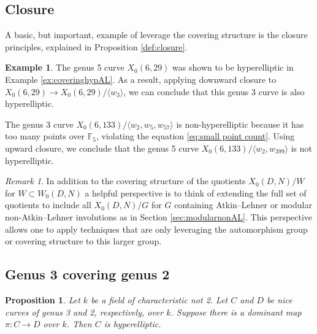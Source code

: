 \documentclass[12pt]{amsart}
\newcommand{\F}{\mathbb{F}}
\numberwithin{equation}{subsection}
\theoremstyle{plain}\newtheorem{ithm}{Theorem}
\theoremstyle{plain}\newtheorem{iprop}[ithm]{Proposition}
\newtheorem{proposition}[equation]{Proposition}
\theoremstyle{definition}
\newtheorem{example}[equation]{Example}
\theoremstyle{remark}
\newtheorem{remark}[equation]{Remark}
\newcommand{\Curve}[2]{X_0({#1},{#2})} %
\newcommand{\ALfull}[2]{W_0({#1},{#2})} %
\begin{document}
\subsection{Closure}
A basic, but important, example of leverage the covering structure is the closure principles, explained in Proposition \ref{def:closure}.


\begin{example}
The genus 5 curve $\Curve{6}{29}$ was shown to be hyperelliptic in Example \ref{ex:coveringhypAL}. As a result, applying downward closure to $\Curve{6}{29} \to \Curve{6}{29}/\langle w_3 \rangle $, we can conclude that this genus 3 curve is also hyperelliptic. 

The genus 3 curve $\Curve{6}{133}/\langle w_2, w_{5}, w_{57} \rangle$ is non-hyperelliptic because it has too many points over $\F_5$, violating the equation \eqref{eq:small point count}. 
Using upward closure, we conclude that the genus 5 curve $\Curve{6}{133}/\langle w_2 , w_{399} \rangle$ is not hyperelliptic.
\end{example}

\begin{remark}
In addition to the covering structure of the quotients $\Curve{D}{N}/W$ for $W \subset \ALfull{D}{N}$ a helpful perspective is to think of extending the full set of quotients to include all $\Curve{D}{N}/G$ for $G$ containing  Atkin--Lehner or modular non-Atkin--Lehner involutions as in Section \ref{sec:modularnonAL}. 
This perspective allows one to  
apply techniques that are only leveraging the automorphism group or covering structure to this larger group.
\end{remark}

\subsection{Genus 3 covering genus 2}
\label{sec:g3coverg2}

\begin{proposition} \label{prop: genus 3 covering genus 2}
Let $k$ be a field of characteristic not 2. Let $C$ and $D$ be nice curves of genus 3 and 2, respectively, over $k$. Suppose there is a dominant map $\pi: C \to D$ over $k$. Then $C$ is hyperelliptic.
\end{proposition}
\end{document}
